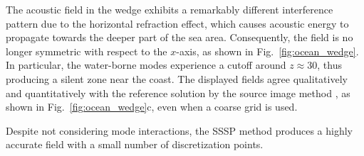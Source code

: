 \documentclass[11pt,a4paper]{article}
\theoremstyle{plain}%
\theoremstyle{definition}
\theoremstyle{remark}
\begin{document}
The acoustic field in the wedge exhibits a remarkably different interference pattern due to the horizontal refraction effect, which causes acoustic energy to propagate towards the deeper part of the sea area. Consequently, the field is no longer symmetric with respect to the $x$-axis, as shown in Fig.~\ref{fig:ocean_wedge}.
In particular, the water-borne modes experience a cutoff around $z\approx30$, thus producing a silent zone near the coast.
The displayed fields agree qualitatively and quantitatively with the reference solution by the source image method \cite{deane1993analysis}, as shown in Fig.~\ref{fig:ocean_wedge}c, even when a coarse grid is used.

Despite not considering mode interactions, the SSSP method produces a highly accurate field with a small number of discretization points.
\end{document}

